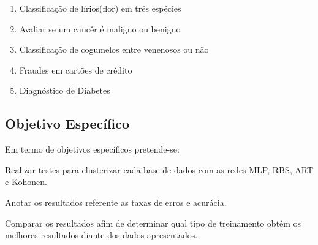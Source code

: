 \begin{enumerate}
	\item Classificação de lírios(flor) em três espécies
	\item Avaliar se um cancêr é maligno ou benigno
	\item Classificação de cogumelos entre venenosos ou não
	\item Fraudes em cartões de crédito
	\item Diagnóstico de Diabetes	
\end{enumerate}


\subsection{Objetivo Específico}
\label{sec:objetivo-específico}
Em termo de objetivos específicos pretende-se:
	\begin{alineas}
		\item Realizar testes para clusterizar cada base de dados com as redes MLP, RBS, ART e Kohonen.
		\item Anotar os resultados referente as taxas de erros e acurácia.
		\item Comparar os resultados afim de determinar qual tipo de treinamento obtém os melhores resultados diante dos dados apresentados.
	\end{alineas}
